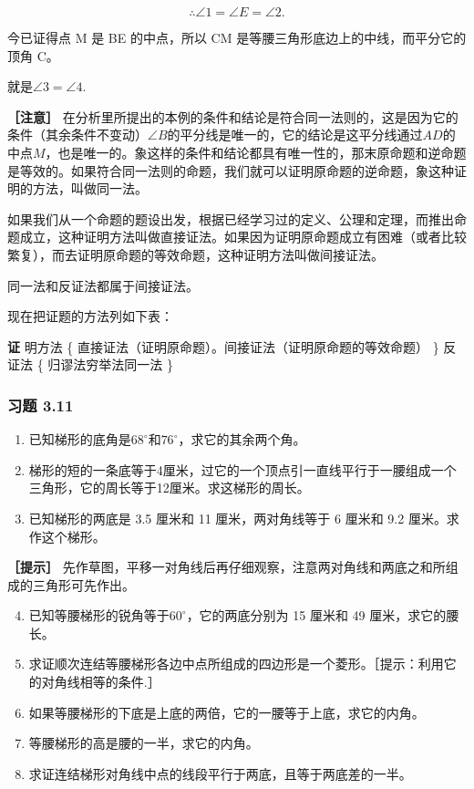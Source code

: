 \[
\therefore \angle 1 = \angle E = \angle 2.
\]

今已证得点 M 是 BE 的中点，所以 CM
是等腰三角形底边上的中线，而平分它的顶角 C。

就是\(\angle 3 = \angle 4.\)

\textbf{［注意］}
在分析里所提出的本例的条件和结论是符合同一法则的，这是因为它的条件（其余条件不变动）\(\angle B\)的平分线是唯一的，它的结论是这平分线通过\(AD\)的中点\(M\)，也是唯一的。象这样的条件和结论都具有唯一性的，那末原命题和逆命题是等效的。如果符合同一法则的命题，我们就可以证明原命题的逆命题，象这种证明的方法，叫做同一法。

如果我们从一个命题的题设出发，根据已经学习过的定义、公理和定理，而推出命题成立，这种证明方法叫做直接证法。如果因为证明原命题成立有困难（或者比较繁复），而去证明原命题的等效命题，这种证明方法叫做间接证法。

同一法和反证法都属于间接证法。

现在把证题的方法列如下表：

\textbf{证} 明方法 \{
直接证法（证明原命题）。间接证法（证明原命题的等效命题） \} 反证法 \{
归谬法穷举法同一法 \}

\subsubsection{习题 3.11}

\begin{enumerate}
\item
  已知梯形的底角是\(68^{\circ}\)和\(76^{\circ}\)，求它的其余两个角。
\item
  梯形的短的一条底等于4厘米，过它的一个顶点引一直线平行于一腰组成一个三角形，它的周长等于12厘米。求这梯形的周长。
\item
  已知梯形的两底是 3.5 厘米和 11 厘米，两对角线等于 6 厘米和 9.2
  厘米。求作这个梯形。
\end{enumerate}

\textbf{［提示］}
先作草图，平移一对角线后再仔细观察，注意两对角线和两底之和所组成的三角形可先作出。

\begin{enumerate}
\setcounter{enumi}{3}
\item
  已知等腰梯形的锐角等于\(60^{\circ}\)，它的两底分别为 15 厘米和 49
  厘米，求它的腰长。
\item
  求证顺次连结等腰梯形各边中点所组成的四边形是一个菱形。［提示：利用它的对角线相等的条件.］
\item
  如果等腰梯形的下底是上底的两倍，它的一腰等于上底，求它的内角。
\item
  等腰梯形的高是腰的一半，求它的内角。
\item
  求证连结梯形对角线中点的线段平行于两底，且等于两底差的一半。
\end{enumerate}

